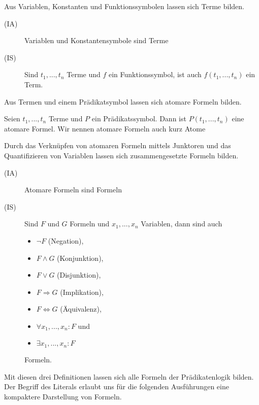 Aus Variablen, Konstanten und Funktionssymbolen lassen sich Terme bilden.

\begin{leftbar}
  \begin{definition}[Terme]\label{terme}
    \begin{description}
    \item[(IA)] Variablen und Konstantensymbole sind Terme \newline
    \item[(IS)] Sind $t_{1},...,t_{n}$ Terme und $f$ ein Funktionssymbol, ist auch $f(t_{1},...,t_{n})$ ein Term.
    \end{description}
  \end{definition}
\end{leftbar}
\noindent
Aus Termen und einem Prädikatsymbol lassen sich atomare Formeln bilden.

\begin{leftbar}
  \begin{definition}
    \newline
    Seien  $t_{1},...,t_{n}$ Terme und $P$ ein Prädikatssymbol. Dann ist $P(t_{1},...,t_{n})$ eine atomare Formel. Wir nennen atomare Formeln auch kurz Atome    
  \end{definition}
\end{leftbar}
\noindent
Durch das Verknüpfen von atomaren Formeln mittels Junktoren und das Quantifizieren von Variablen lassen sich zusammengesetzte Formeln bilden.

\begin{leftbar}
  \begin{definition}[Formeln]
    \begin{description}
    \item[(IA)] Atomare Formeln sind Formeln \newline
    \item[(IS)] Sind $F$ und $G$ Formeln und $x_{1},...,x_{n}$ Variablen, dann sind auch
      \begin{itemize}
      \item $\neg F$ (Negation),
      \item $F \wedge G$ (Konjunktion),
      \item $F \vee G$ (Disjunktion),
      \item $F \Rightarrow G$ (Implikation),
      \item $F \Leftrightarrow G$ (Äquivalenz),
      \item $\forall x_{1},...,x_{n}:F$ und
      \item $\exists x_{1},...,x_{n}:F$
      \end{itemize}
      Formeln.
    \end{description}
  \end{definition}
\end{leftbar}
\noindent
Mit diesen drei Definitionen lassen sich alle Formeln der Prädikatenlogik bilden. Der Begriff des Literals erlaubt uns für die folgenden Ausführungen eine kompaktere Darstellung von Formeln.

